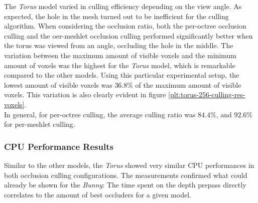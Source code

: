 
\noindent
The \emph{Torus} model varied in culling efficiency depending on the view angle. As expected, the hole 
in the mesh turned out to be inefficient for the culling algorithm. When considering the occlusion ratio, 
both the per-octree occlusion culling and the oer-meshlet occlusion culling performed significantly better 
when the torus was viewed from an angle, occluding the hole in the middle. The variation between the maximum 
amount of visible voxels and the minimum amount of voxels was the highest for the \emph{Torus} model, which 
is remarkable compared to the other models. Using this particular experimental setup, the lowest amount of 
visible voxels was $36.8\%$ of the maximum amount of visible voxels. This variation is also clearly evident 
in figure \ref{plt:torus-256-culling-res-voxels}. \\ 

\noindent
In general, for per-octree culling, the average culling ratio was $84.4\%$, and $92.6\%$ for per-meshlet culling. 

\subsubsection*{CPU Performance Results} \label{subsubsec-cpu-performance-results-torus}

Similar to the other models, the \emph{Torus} showed very similar \ac{CPU} performances in both 
occlusion culling configurations. The measurements confirmed what could already be shown for the 
\emph{Bunny}: The time spent on the depth prepass directly correlates to the amount of best occluders 
for a given model.


